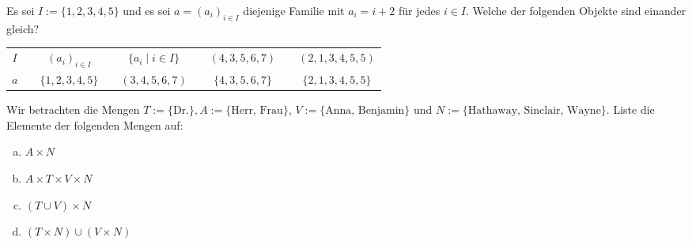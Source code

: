 \begin{aufg}
Es sei $I:=\{1,2,3,4,5\}$ und es sei $a=(a_i)_{i\in I}$ diejenige Familie mit $a_i=i+2$ für jedes $i\in I$.
Welche der folgenden Objekte sind einander gleich?
\begin{center}
	{\renewcommand{\arraystretch}{1.6}
		\begin{tabular}{ccccccccc}
		 $I$ && $(a_i)_{i\in I}$&& $\{a_i\mid i\in I\}$ && $(4,3,5,6,7)$ && $(2,1,3,4,5,5)$ \\
		 $a$ && $\{1,2,3,4,5\}$ && $(3,4,5,6,7)$ && $\{4,3,5,6,7\}$ && $\{2,1,3,4,5,5\}$
	\end{tabular}}
\end{center}
\end{aufg}






\begin{aufg}
Wir betrachten die Mengen $T := \{ \text{Dr.} \}, A := \{ \text{Herr, Frau} \}$, $V
:= \{ \text{Anna, Benjamin} \}$ und $N := \{ \text{Hathaway, Sinclair, Wayne}
\}$. Liste die Elemente der folgenden Mengen auf:
\begin{enumerate}[a)]
	\item $A \times N$
	\item $A\times T \times V\times N$
	\item $(T \cup V) \times N$
	\item $(T\times N)\cup (V\times N)$
\end{enumerate}
\end{aufg}





\begin{comment}
\begin{aufg}[Teilmengen]
Seien $I$ eine nichtleere Menge, $A,B$ zwei weitere Mengen, sowie $(A_i)_{i\in I}$ eine Familie von Mengen. Mach dir klar, dass die folgenden Teilmengenbeziehungen gelten:\footnote{vgl. dazu \cref{undoderaxiome}, \cref{allaxiom} und \cref{exaxiom}.}
\begin{align*}
 A \cap B & \subseteq A & A & \subseteq A \cup B \\
 A \cap B & \subseteq B & B & \subseteq A \cup B \\
 \forall j\in I:\quad \bigcap_{i\in I}A_i & \subset A_j & \forall j\in I:\quad  A_j & \subseteq \bigcup_{i\in I} A_i \\
 A \cap B & \subseteq A \cup B & \bigcap_{i\in I}A_i & \subset \bigcup_{i\in I}A_i
\end{align*}
\end{aufg}
\end{comment}




